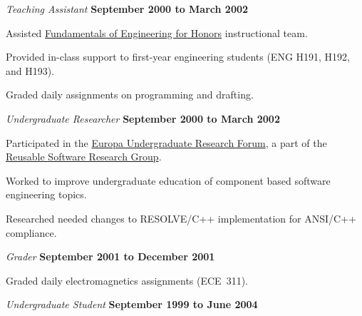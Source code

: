 \documentclass[10pt]{article}
\newenvironment{outerlist}[1][\enskip\textbullet]%
        {\begin{itemize}[#1]}{\end{itemize}%
         \vspace{-.6\baselineskip}}
\newenvironment{innerlist}[1][\enskip\textbullet]%
        {\begin{compactitem}[#1]}{\end{compactitem}}
\begin{document}
\begin{outerlist}
\item[] \textit{Teaching Assistant}%
        \hfill \textbf{September 2000 to March 2002}
\begin{innerlist}
\item Assisted \href{http://feh.eng.ohio-state.edu/}
                    {Fundamentals of Engineering for Honors}
      instructional team.
\item Provided in-class support to first-year engineering students (ENG
        H191, H192, and H193).
\item Graded daily assignments on programming and drafting.
\end{innerlist}

\item[] \textit{Undergraduate Researcher}%
        \hfill \textbf{September 2000 to March 2002}
\begin{innerlist}
\item Participated in the
        \href{http://www.cse.ohio-state.edu/europa/}{Europa
        Undergraduate Research Forum}, a part of the
        \href{http://www.cse.ohio-state.edu/rsrg/}{Reusable Software
        Research Group}.
\item Worked to improve undergraduate education of component based
        software engineering topics.
\item Researched needed changes to RESOLVE/C++ implementation for
        ANSI/C++ compliance.
\end{innerlist}

\item[] \textit{Grader}%
        \hfill \textbf{September 2001 to December 2001}
\begin{innerlist}
\item Graded daily electromagnetics assignments (ECE~311).
\end{innerlist}

\item[] \textit{Undergraduate Student}%
        \hfill \textbf{September 1999 to June 2004}
\end{outerlist}
\end{document}

